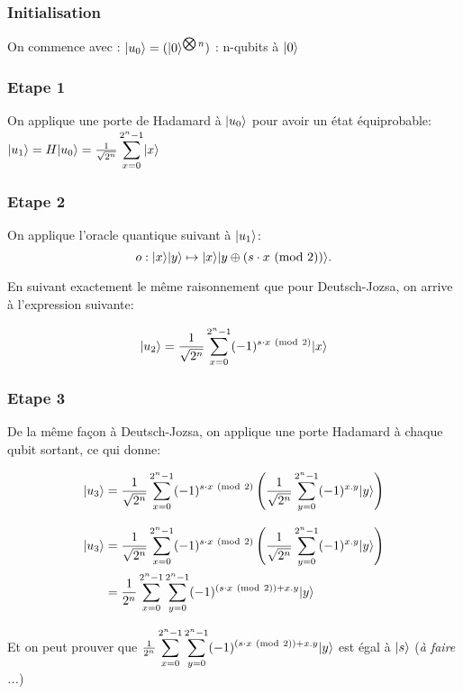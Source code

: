 \documentclass[12pt,a4paper]{article}
\DeclarePairedDelimiter\ket{\lvert}{\rangle}
\newcommand{\Mod}[1]{\ (\mathrm{mod}\ #1)}
\begin{document}
\subsubsection{Initialisation}
On commence avec :
$\ket{u_0} = (\ket{0}^{\bigotimes n})$
: n-qubits à $\ket{0}$

\subsubsection{Etape 1}

On applique une porte de Hadamard à $\ket{u_0}$ pour avoir un état équiprobable:
$\ket{u_1} = H\ket{u_0} = \frac{1}{\sqrt{2^n}}
\displaystyle\sum_{x=0}^{2^n-1} \ket{x}$

\subsubsection{Etape 2}
On applique l'oracle quantique suivant à $\ket{u_1}$:
\[ o : \ket{x}\ket{y}\mapsto \ket{x}\ket{y\oplus (s \cdot x \Mod{2})}. \]

En suivant exactement le même raisonnement que pour Deutsch-Jozsa, on arrive à l'expression suivante: 

\begin{equation}\ket{u_2} = \frac{1}{\sqrt{2^n}}
\displaystyle\sum_{x=0}^{2^n-1} (-1)^{s \cdot x \Mod{2}}\ket{x} 
\end{equation}

\subsubsection{Etape 3}

De la même façon à Deutsch-Jozsa, on applique une porte Hadamard à chaque qubit sortant, ce qui donne:

\[ \ket{u_3} = \frac{1}{\sqrt{2^{n}}}
\displaystyle\sum_{x=0}^{2^n-1} (-1)^{s \cdot x \Mod{2}} \left( \frac{1}{\sqrt{2^{n}}} \displaystyle\sum_{y=0}^{2^n-1} (-1)^{x.y}\ket{y} \right) \]

\begin{align}
  \ket{u_3} &= \frac{1}{\sqrt{2^{n}}}\displaystyle\sum_{x=0}^{2^n-1} (-1)^{s \cdot x \Mod{2}} \left( \frac{1}{\sqrt{2^{n}}} \displaystyle\sum_{y=0}^{2^n-1} (-1)^{x.y}\ket{y} \right) \\
  & = \frac{1}{2^{n}} \displaystyle\sum_{x=0}^{2^n-1} \displaystyle\sum_{y=0}^{2^n-1} (-1)^{(s \cdot x \Mod{2}) + x.y} \ket{y}
  \end{align}

Et on peut prouver que $\frac{1}{2^{n}} \displaystyle\sum_{x=0}^{2^n-1} \displaystyle\sum_{y=0}^{2^n-1} (-1)^{(s \cdot x \Mod{2}) + x.y} \ket{y}$ est égal à $\ket{s}$ (\textit{à faire ...})
\end{document}
